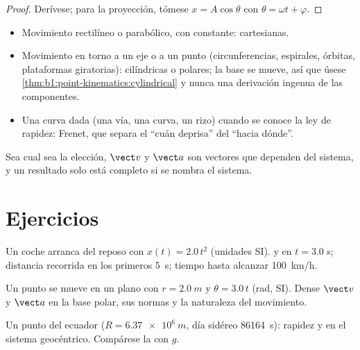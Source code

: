 \begin{proof}
Derívese; para la proyección, tómese $x = A\cos\theta$ con $\theta =
\omega t + \varphi$.
\end{proof}

\begin{method}\label{met:b1:point-kinematics:choose}
\begin{itemize}
  \item Movimiento rectilíneo o parabólico, con  constante:
        cartesianas.
  \item Movimiento en torno a un eje o a un punto (circunferencias,
        espirales, órbitas, plataformas giratorias): cilíndricas o
        polares; la base se mueve, así que úsese
        \cref{thm:b1:point-kinematics:cylindrical} y nunca una derivación
        ingenua de las componentes.
  \item Una curva dada (una vía, una curva, un rizo) cuando se conoce la
        ley de rapidez: Frenet, que separa el ``cuán deprisa'' del ``hacia dónde''.
\end{itemize}
Sea cual sea la elección, $\vect v$ y $\vect a$ son vectores que dependen
del sistema, y un resultado solo está completo si se nombra el sistema.
\end{method}

\section{Ejercicios}

\begin{exercise}[$\star$]\label{exo:b1:point-kinematics:1}
Un coche arranca del reposo con $x(t) = 2.0\,t^2$ (unidades SI). 
y  en $t = \qty{3.0}{s}$; distancia recorrida en los primeros
\qty{5}{s}; tiempo hasta alcanzar \qty{100}{km/h}.
\end{exercise}

\begin{exercise}[$\star$]\label{exo:b1:point-kinematics:2}
Un punto se mueve en un plano con $r = \qty{2.0}{m}$ y $\theta = 3.0\,t$
(rad, SI). Dense $\vect v$ y $\vect a$ en la base polar, sus normas y la
naturaleza del movimiento.
\end{exercise}

\begin{exercise}[$\star$]\label{exo:b1:point-kinematics:3}
Un punto del ecuador ($R = \qty{6.37e6}{m}$, día sidéreo \qty{86164}{s}):
rapidez y  en el sistema geocéntrico. Compárese la 
con $g$.
\end{exercise}

